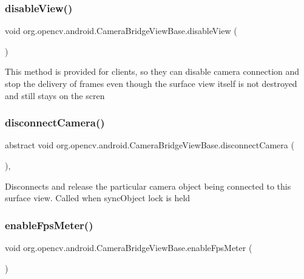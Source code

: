 \subsubsection{\texorpdfstring{disable\+View()}{disableView()}}
{\footnotesize\ttfamily void org.\+opencv.\+android.\+Camera\+Bridge\+View\+Base.\+disable\+View (\begin{DoxyParamCaption}{ }\end{DoxyParamCaption})}

This method is provided for clients, so they can disable camera connection and stop the delivery of frames even though the surface view itself is not destroyed and still stays on the scren \mbox{\label{classorg_1_1opencv_1_1android_1_1_camera_bridge_view_base_a716a7c7d298dfcb50926ac6ebd1fbddf}} 
\subsubsection{\texorpdfstring{disconnect\+Camera()}{disconnectCamera()}}
{\footnotesize\ttfamily abstract void org.\+opencv.\+android.\+Camera\+Bridge\+View\+Base.\+disconnect\+Camera (\begin{DoxyParamCaption}{ }\end{DoxyParamCaption})\hspace{0.3cm}{\ttfamily [abstract]}, {\ttfamily [protected]}}

Disconnects and release the particular camera object being connected to this surface view. Called when sync\+Object lock is held \mbox{\label{classorg_1_1opencv_1_1android_1_1_camera_bridge_view_base_accb2bd3e829565737c0b606043441ee0}} 
\subsubsection{\texorpdfstring{enable\+Fps\+Meter()}{enableFpsMeter()}}
{\footnotesize\ttfamily void org.\+opencv.\+android.\+Camera\+Bridge\+View\+Base.\+enable\+Fps\+Meter (\begin{DoxyParamCaption}{ }\end{DoxyParamCaption})}

